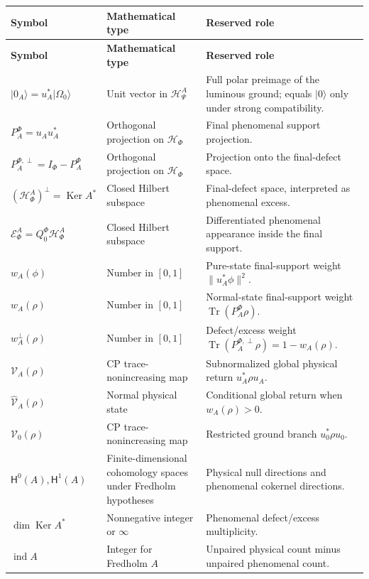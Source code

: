 \documentclass[11pt,reqno]{scrartcl}
\newcommand{\scrHF}{\mathscr H_{\Phi}}
\newcommand{\QzeroF}{Q_{0}^{\Phi}}
\newcommand{\ket}[1]{\lvert #1\rangle}
\DeclareMathOperator{\Ker}{Ker}
\DeclareMathOperator{\ind}{ind}
\newcommand{\actHP}{\mathscr H_{\Psi}^{A}}
\newcommand{\actHF}{\mathscr H_{\Phi}^{A}}
\newcommand{\suppProjF}{P_{A}^{\Phi}}
\newcommand{\defectProjF}{P_{A}^{\Phi,\perp}}
\DeclareMathOperator{\Tr}{Tr}
\newcommand{\defectHF}{(\mathscr H_{\Phi}^{A})^{\perp}}
\newcommand{\actAppF}{\mathscr E_{\Phi}^{A}}
\newcommand{\presentWeight}{w_{A}}
\newcommand{\defectWeight}{w_{A}^{\perp}}
\newcommand{\returnOp}{\mathcal V_{A}}
\newcommand{\returnOpCond}{\widehat{\mathcal V}_{A}}
\newcommand{\returnGroundOp}{\mathcal V_{0}}
\newcommand{\cohZero}{\mathsf H^{0}(A)}
\newcommand{\cohOne}{\mathsf H^{1}(A)}
\theoremstyle{plain}
\theoremstyle{definition}
\theoremstyle{remark}
\begin{document}
\begin{longtable}{>{\raggedright\arraybackslash}p{}
>{\raggedright\arraybackslash}p{}
>{\raggedright\arraybackslash}p{}}
\toprule
\textbf{Symbol} & \textbf{Mathematical type} & \textbf{Reserved role} \\
\midrule
\endfirsthead
\toprule
\textbf{Symbol} & \textbf{Mathematical type} & \textbf{Reserved role} \\
\midrule
\endhead
$\ket{0_A}=u_A^*\ket{\Omega_0}$ & Unit vector in $\actHP$ & Full polar preimage of the luminous ground; equals $\ket0$ only under strong compatibility. \\
$\suppProjF=u_Au_A^*$ & Orthogonal projection on $\scrHF$ & Final phenomenal support projection. \\
$\defectProjF=I_{\Phi}-\suppProjF$ & Orthogonal projection on $\scrHF$ & Projection onto the final-defect space. \\
$\defectHF=\Ker A^*$ & Closed Hilbert subspace & Final-defect space, interpreted as phenomenal excess. \\
$\actAppF=\QzeroF\actHF$ & Closed Hilbert subspace & Differentiated phenomenal appearance inside the final support. \\
$\presentWeight(\phi)$ & Number in $[0,1]$ & Pure-state final-support weight $\|u_A^*\phi\|^2$. \\
$\presentWeight(\rho)$ & Number in $[0,1]$ & Normal-state final-support weight $\Tr(\suppProjF\rho)$. \\
$\defectWeight(\rho)$ & Number in $[0,1]$ & Defect/excess weight $\Tr(\defectProjF\rho)=1-\presentWeight(\rho)$. \\
$\returnOp(\rho)$ & CP trace-nonincreasing map & Subnormalized global physical return $u_A^*\rho u_A$. \\
$\returnOpCond(\rho)$ & Normal physical state & Conditional global return when $\presentWeight(\rho)>0$. \\
$\returnGroundOp(\rho)$ & CP trace-nonincreasing map & Restricted ground branch $u_0^*\rho u_0$. \\
$\cohZero,\cohOne$ & Finite-dimensional cohomology spaces under Fredholm hypotheses & Physical null directions and phenomenal cokernel directions. \\
$\dim\Ker A^*$ & Nonnegative integer or $\infty$ & Phenomenal defect/excess multiplicity. \\
$\ind A$ & Integer for Fredholm $A$ & Unpaired physical count minus unpaired phenomenal count. \\
\bottomrule
\end{longtable}
\end{document}
